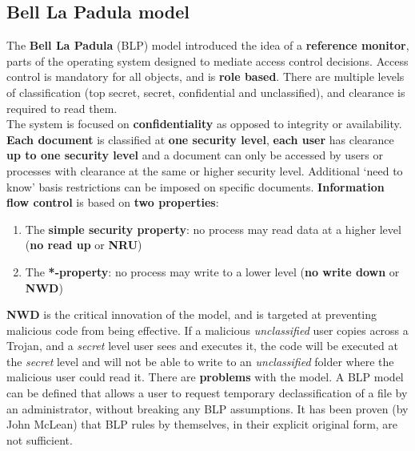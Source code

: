 \documentclass[final]{article}
\newcommand{\np}{\vspace{8pt} \\}
\begin{document}
\subsection{Bell La Padula model}
The \textbf{Bell La Padula} (BLP) model introduced the idea of a \textbf{reference monitor}, parts of the operating system designed to mediate access control decisions. Access control is mandatory for all objects, and is \textbf{role based}. There are multiple levels of classification (top secret, secret, confidential and unclassified), and clearance is required to read them. \np
The system is focused on \textbf{confidentiality} as opposed to integrity or availability. \textbf{Each document} is classified at \textbf{one security level}, \textbf{each user} has clearance \textbf{up to one security level} and a document can only be accessed by users or processes with clearance at the same or higher security level. Additional `need to know' basis restrictions can be imposed on specific documents. \textbf{Information flow control} is based on \textbf{two properties}:
\begin{enumerate}
	\item The \textbf{simple security property}: no process may read data at a higher level (\textbf{no read up} or \textbf{NRU})
	\item The \textbf{*-property}: no process may write to a lower level (\textbf{no write down} or \textbf{NWD})
\end{enumerate}
\textbf{NWD} is the critical innovation of the model, and is targeted at preventing malicious code from being effective. If a malicious \textit{unclassified} user copies across a Trojan, and a \textit{secret} level user sees and executes it, the code will be executed at the \textit{secret} level and will not be able to write to an \textit{unclassified} folder where the malicious user could read it. There are \textbf{problems} with the model. A BLP model can be defined that allows a user to request temporary declassification of a file by an administrator, without breaking any BLP assumptions. It has been proven (by John McLean) that BLP rules by themselves, in their explicit original form, are not sufficient.
\end{document}
